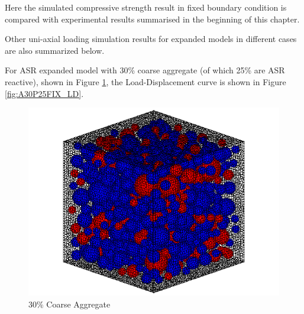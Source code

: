%



Here the simulated compressive strength result in fixed boundary condition is compared with experimental results summarised in the beginning of this chapter.

\clearpage

Other uni-axial loading simulation results for expanded models in different cases are also summarized below.

For ASR expanded model with 30\% coarse aggregate (of which 25\% are ASR reactive), shown in Figure \ref{fig:A30P25_model}, the Load-Displacement curve is shown in Figure \ref{fig:A30P25FIX_LD}.

\begin{figure}[ht]
\centering
\includegraphics[width=.3\linewidth]{Files/Aggregate/A30P25.png}
  \caption{30\% Coarse Aggregate}
  \label{fig:A30P25_model}
\end{figure}


